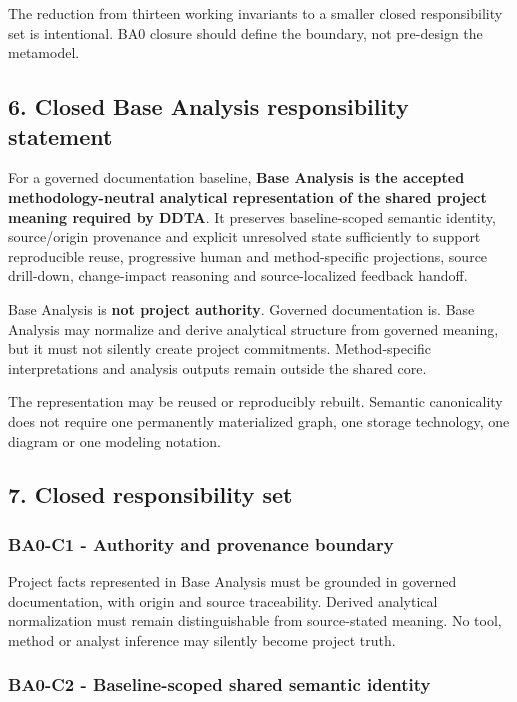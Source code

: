 \documentclass[
  10pt,
]{article}
\begin{document}
The reduction from thirteen working invariants to a smaller closed
responsibility set is intentional. BA0 closure should define the
boundary, not pre-design the metamodel.

\subsection{6. Closed Base Analysis responsibility
statement}\label{closed-base-analysis-responsibility-statement}

For a governed documentation baseline, \textbf{Base Analysis is the
accepted methodology-neutral analytical representation of the shared
project meaning required by DDTA}. It preserves baseline-scoped semantic
identity, source/origin provenance and explicit unresolved state
sufficiently to support reproducible reuse, progressive human and
method-specific projections, source drill-down, change-impact reasoning
and source-localized feedback handoff.

Base Analysis is \textbf{not project authority}. Governed documentation
is. Base Analysis may normalize and derive analytical structure from
governed meaning, but it must not silently create project commitments.
Method-specific interpretations and analysis outputs remain outside the
shared core.

The representation may be reused or reproducibly rebuilt. Semantic
canonicality does not require one permanently materialized graph, one
storage technology, one diagram or one modeling notation.

\subsection{7. Closed responsibility
set}\label{closed-responsibility-set}

\subsubsection{BA0-C1 - Authority and provenance
boundary}\label{ba0-c1---authority-and-provenance-boundary}

Project facts represented in Base Analysis must be grounded in governed
documentation, with origin and source traceability. Derived analytical
normalization must remain distinguishable from source-stated meaning. No
tool, method or analyst inference may silently become project truth.

\subsubsection{BA0-C2 - Baseline-scoped shared semantic
identity}\label{ba0-c2---baseline-scoped-shared-semantic-identity}
\end{document}
